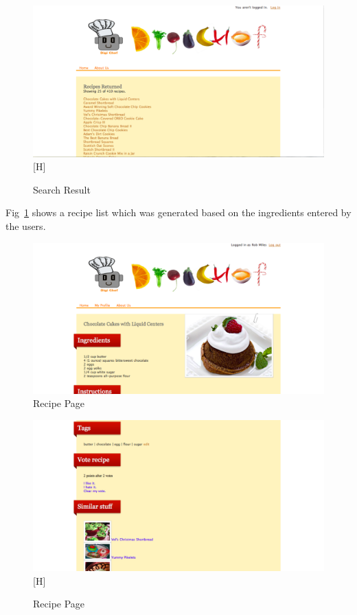 \begin{figure}[H]
\includegraphics[width=1\textwidth]{result_list}[H]
\caption{Search Result}
\label{fig:result_list}
\end{figure}

Fig~\ref{fig:result_list} shows a recipe list which was generated based on the ingredients entered by the users.

\begin{figure}[H]
\includegraphics[width=1\textwidth]{result_recipe}
\caption{Recipe Page}
\label{fig:result_recipe}
\end{figure}

\begin{figure}[H]
\includegraphics[width=1\textwidth]{result_recipe2}[H]
\caption{Recipe Page}
\label{fig:result_recipe2}
\end{figure}

